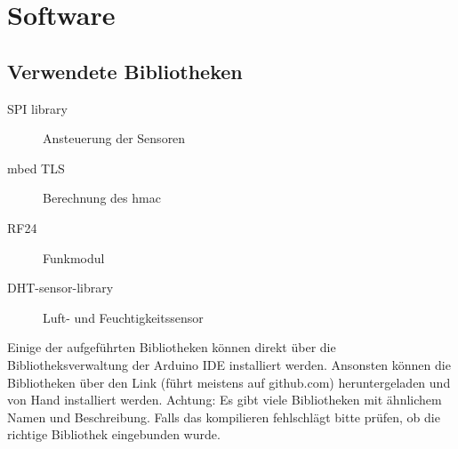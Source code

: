 \documentclass[
  12pt, %
  a4paper, %
  twoside, %
  openany, %
  numbers=noenddot, %
  BCOR=5mm, %
  parskip=half*, %
  thesis, %
]{bfhbook}
\begin{document}
 \section{Software}
 \subsection{Verwendete Bibliotheken}

  \begin{description}
\item[SPI library] Ansteuerung der Sensoren \cite{spi}
\item[mbed TLS] Berechnung des \Gls{hmac} \cite{mbedTLS}
\item[RF24] Funkmodul \cite{nrf24}
\item[DHT-sensor-library] Luft- und Feuchtigkeitssensor \cite{dht}
 \end{description}
Einige der aufgeführten Bibliotheken können direkt über die Bibliotheksverwaltung der Arduino IDE installiert werden. Ansonsten können die Bibliotheken über den Link (führt meistens auf github.com) heruntergeladen und von Hand installiert werden. 
{\color{red}Achtung: Es gibt viele Bibliotheken mit ähnlichem Namen und Beschreibung. Falls das kompilieren fehlschlägt bitte prüfen, ob die richtige Bibliothek eingebunden wurde.}
\end{document}
